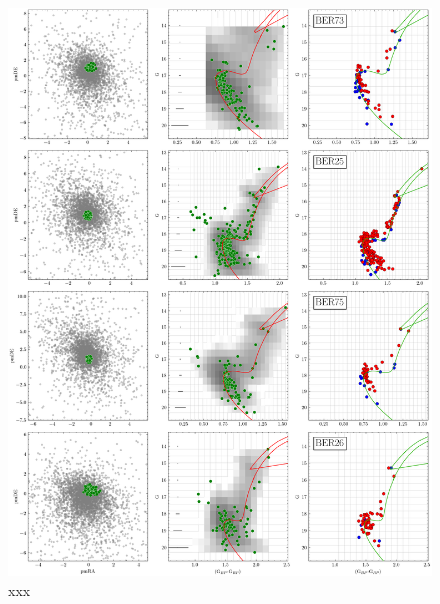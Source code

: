 \documentclass[referee]{aa}
\begin{document}
\begin{appendix}
 \begin{figure}
  \centering
  \includegraphics[height=.95\textheight]{figs/0_fpars.png}
  \caption{xxx}
  \label{fig:8fpars}
 \end{figure}


\end{appendix}
\end{document}

